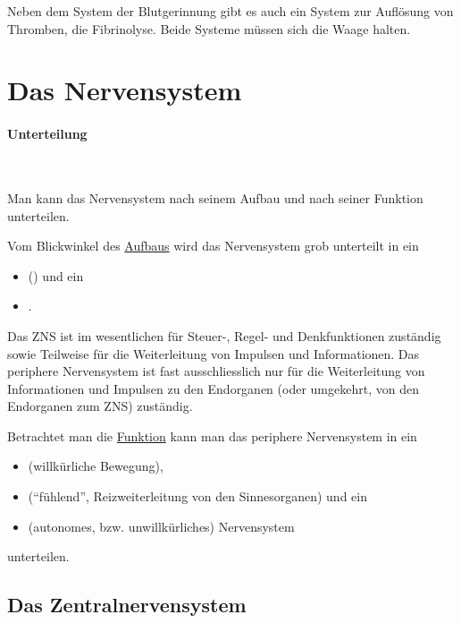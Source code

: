 
Neben dem System der Blutgerinnung
gibt es auch ein System zur Auflösung von Thromben, die Fibrinolyse. Beide
Systeme müssen sich die Waage halten.


\clearpage
\section{Das Nervensystem}

\paragraph{Unterteilung}~

Man kann das Nervensystem nach seinem Aufbau und nach seiner Funktion
unterteilen.

Vom Blickwinkel des \underline{Aufbaus} wird das Nervensystem grob
unterteilt in ein


\begin{itemize}
\item {} () und ein 
\item {}.
\end{itemize}

Das ZNS ist im wesentlichen für Steuer-, Regel- und Denkfunktionen
zuständig sowie Teilweise für die Weiterleitung von Impulsen und
Informationen. Das periphere Nervensystem ist fast ausschliesslich nur
für die Weiterleitung von Informationen und Impulsen zu den
Endorganen (oder umgekehrt, von den Endorganen zum ZNS) zuständig. 

Betrachtet man die \underline{Funktion} kann man das
periphere Nervensystem in ein

\begin{itemize}
\item {} (willkürliche Bewegung),
\item {} ("`fühlend"', Reizweiterleitung von
den Sinnesorganen) und ein
\item {} (autonomes, bzw. unwillkürliches)
Nervensystem
\end{itemize}

unterteilen. 

\subsection{Das Zentralnervensystem}

